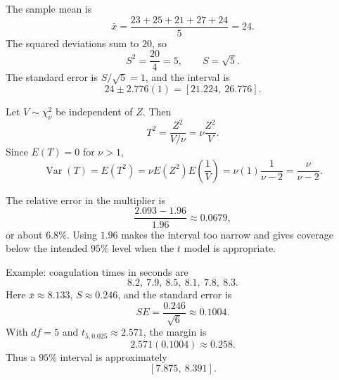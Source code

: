 \begin{solproblema}[prob:e378132]
The sample mean is
\[
	\bar x=\frac{23+25+21+27+24}{5}=24.
\]
The squared deviations sum to $20$, so
\[
	S^2=\frac{20}{4}=5,\qquad S=\sqrt5.
\]
The standard error is $S/\sqrt5=1$, and the interval is
\[
	24\pm 2.776(1)=[21.224,\ 26.776].
\]
\end{solproblema}

\begin{solproblema}[prob:7943b46]
Let $V\sim\chi^2_\nu$ be independent of $Z$. Then
\[
	T^2=\frac{Z^2}{V/\nu}=\nu\frac{Z^2}{V}.
\]
Since $E(T)=0$ for $\nu>1$,
\[
	\operatorname{Var}(T)=E(T^2)=\nu E(Z^2)E\left(\frac1V\right)
	=\nu(1)\frac{1}{\nu-2}
	=\frac{\nu}{\nu-2}.
\]
\end{solproblema}

\begin{solproblema}
The relative error in the multiplier is
\[
	\frac{2.093-1.96}{1.96}\approx 0.0679,
\]
or about $6.8\%$. Using $1.96$ makes the interval too narrow and gives coverage below the intended $95\%$ level when the $t$ model is appropriate.
\end{solproblema}

\begin{solproblema}[prob:c34507c]
Example: coagulation times in seconds are
\[
	8.2,\ 7.9,\ 8.5,\ 8.1,\ 7.8,\ 8.3.
\]
Here $\bar x\approx 8.133$, $S\approx 0.246$, and the standard error is
\[
	SE=\frac{0.246}{\sqrt6}\approx 0.1004.
\]
With $df=5$ and $t_{5,0.025}\approx 2.571$, the margin is
\[
	2.571(0.1004)\approx 0.258.
\]
Thus a $95\%$ interval is approximately
\[
	[7.875,\ 8.391].
\]
\end{solproblema}
